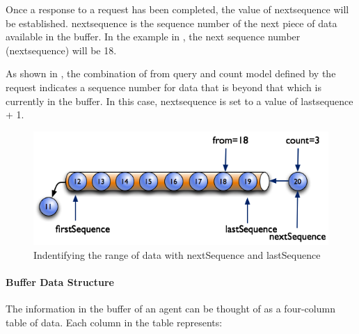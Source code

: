 \FloatBarrier


Once a \gls{response} to a \gls{request} has been completed, the value of \gls{nextsequence} will be established.  \gls{nextsequence} is the \gls{sequence number} of the next piece of data available in the \gls{buffer}.  In the example in , the next \gls{sequence number} (\gls{nextsequence}) will be 18.

As shown in , the combination of \gls{from query} and \gls{count model} defined by the \gls{request} indicates a \gls{sequence number} for data that is beyond that which is currently in the \gls{buffer}.  In this case, \gls{nextsequence} is set to a value of \gls{lastsequence} + 1.  

\begin{figure}[ht]
  \centering
  \includegraphics[width=1.0\textwidth]{figures/identifying-the-range-of-data-with-nextsequence-and-lastsequence.png}
  \caption{Indentifying the range of data with nextSequence and lastSequence}
  \label{fig:identifying-the-range-of-data-with-nextsequence-and-lastsequence}
\end{figure}

\FloatBarrier

\paragraph{Buffer Data Structure}\mbox{}

The information in the \gls{buffer} of an \gls{agent} can be thought of as a four-column table of data.  Each column in the table represents:

